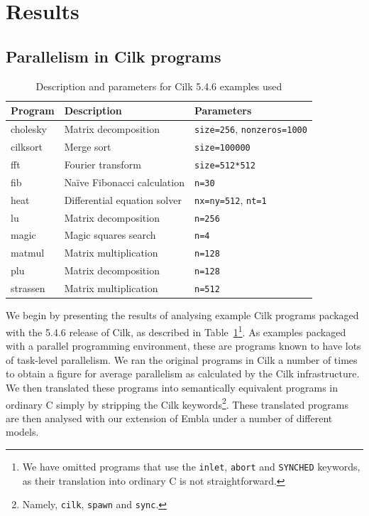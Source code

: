 \section{Results} \label{sresults}

\subsection{Parallelism in Cilk programs}

\begin{table}
\small
\begin{tabular}{ | l | l | l | }
\hline
Program & Description & Parameters \\
\hline
cholesky & Matrix decomposition & \texttt{size=256}, \texttt{nonzeros=1000} \\
cilksort & Merge sort & \texttt{size=100000} \\
fft & Fourier transform & \texttt{size=512*512} \\
fib & Na\"ive Fibonacci calculation & \texttt{n=30} \\
heat & Differential equation solver & \texttt{nx=ny=512}, \texttt{nt=1} \\ 
lu & Matrix decomposition & \texttt{n=256} \\
magic & Magic squares search & \texttt{n=4} \\
matmul & Matrix multiplication & \texttt{n=128} \\
plu & Matrix decomposition & \texttt{n=128} \\
strassen & Matrix multiplication & \texttt{n=512} \\
\hline
\end{tabular}
\caption{Description and parameters for Cilk 5.4.6 examples used}
\label{cilk-ex}
\end{table}

We begin by presenting the results of analysing example Cilk programs packaged with the 5.4.6 release of Cilk, as described in Table~\ref{cilk-ex}\footnote{We have omitted programs that use the \texttt{inlet}, \texttt{abort} and \texttt{SYNCHED} keywords, as their translation into ordinary C is not straightforward.}.
As examples packaged with a parallel programming environment, these are programs known to have lots of task-level parallelism.
We ran the original programs in Cilk a number of times to obtain a figure for average parallelism as calculated by the Cilk infrastructure.
We then translated these programs into semantically equivalent programs in ordinary C simply by stripping the Cilk keywords\footnote{Namely, \texttt{cilk}, \texttt{spawn} and \texttt{sync}.}.
These translated programs are then analysed with our extension of Embla under a number of different models.


